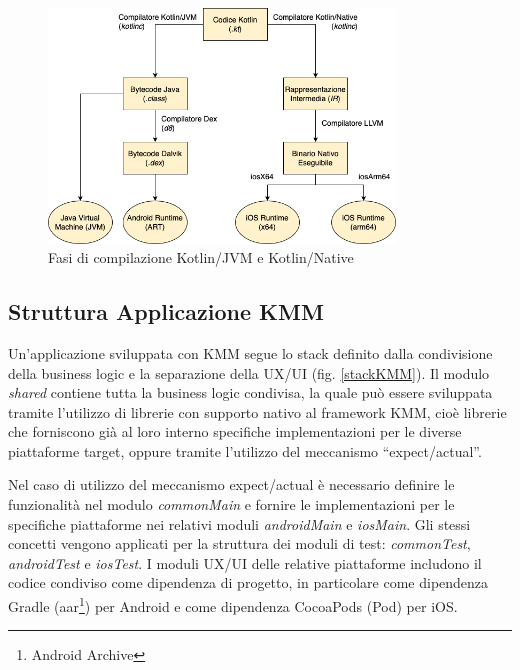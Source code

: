 \begin{figure}[H]
    \centering
    \includegraphics[width=0.82\textwidth]{img/compilatore_kotlin.png}
    \caption{Fasi di compilazione Kotlin/JVM e Kotlin/Native}
    \label{kotlin-native-compile}
\end{figure}

\subsection{Struttura Applicazione KMM}
Un'applicazione sviluppata con KMM segue lo stack definito dalla condivisione della business logic e la separazione della UX/UI (fig. \ref{stackKMM}). 
Il modulo \textit{shared} contiene tutta la business logic condivisa, 
la quale può essere sviluppata tramite l'utilizzo di librerie con supporto nativo al framework KMM, 
cioè librerie che forniscono già al loro interno specifiche implementazioni per le diverse piattaforme target, 
oppure tramite l'utilizzo del meccanismo ``expect/actual''.

Nel caso di utilizzo del meccanismo expect/actual è necessario definire le funzionalità nel modulo \textit{commonMain} e fornire le implementazioni per le specifiche piattaforme nei relativi moduli \textit{androidMain} e \textit{iosMain}. 
Gli stessi concetti vengono applicati per la struttura dei moduli di test: \textit{commonTest}, \textit{androidTest} e \textit{iosTest}. 
I moduli UX/UI delle relative piattaforme includono il codice condiviso come dipendenza di progetto, 
in particolare come dipendenza Gradle (aar\footnote{Android Archive}) per Android e come dipendenza CocoaPods (Pod) per iOS.

